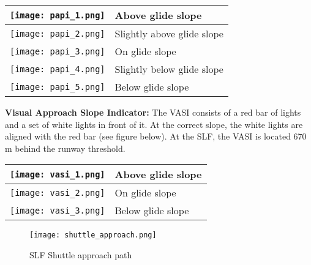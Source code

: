 \documentclass[Orbiter User Manual.tex]{subfiles}
\begin{document}
	\begin{longtable}{ |p{} p{}| }
	\hline\rule{0pt}{2ex}
	\texttt{[image: papi\_1.png]} & Above glide slope\\
	\hline\rule{0pt}{2ex}
	\texttt{[image: papi\_2.png]} & Slightly above glide slope\\
	\hline\rule{0pt}{2ex}
	\texttt{[image: papi\_3.png]} & On glide slope\\
	\hline\rule{0pt}{2ex}
	\texttt{[image: papi\_4.png]} & Slightly below glide slope\\
	\hline\rule{0pt}{2ex}
	\texttt{[image: papi\_5.png]} & Below glide slope\\
	\hline
	\end{longtable}

\noindent
\textbf{Visual Approach Slope Indicator:} The VASI consists of a red bar of lights and a set of white lights in front of it. At the correct slope, the white lights are aligned with the red bar (see figure below). At the SLF, the VASI is located 670 m behind the runway threshold.

	\begin{longtable}{ |p{} p{}| }
	\hline\rule{0pt}{2ex}
	\texttt{[image: vasi\_1.png]} & Above glide slope\\
	\hline\rule{0pt}{2ex}
	\texttt{[image: vasi\_2.png]} & On glide slope\\
	\hline\rule{0pt}{2ex}
	\texttt{[image: vasi\_3.png]} & Below glide slope\\
	\hline
	\end{longtable}

\begin{figure}[H]
	\centering
	\texttt{[image: shuttle\_approach.png]}
	\caption{SLF Shuttle approach path}
\end{figure}
\end{document}
